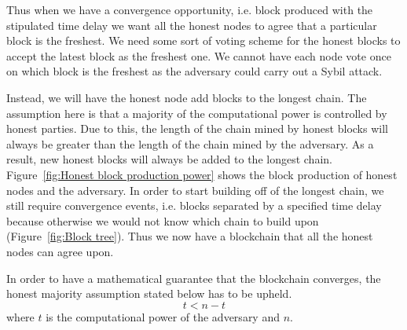Thus when we have a convergence opportunity, i.e. block produced with the stipulated time delay we want all the honest nodes to agree that a particular block is the freshest.
We need some sort of voting scheme for the honest blocks to accept the latest block as the freshest one. We cannot have each node vote once on which block is the freshest as the adversary could carry out a Sybil attack.

Instead, we will have the honest node add blocks to the longest chain. The assumption here is that a majority of the computational power is controlled by honest parties. Due to this, the length of the chain mined by honest blocks will always be greater than the length of the chain mined by the adversary. As a result, new honest blocks will always be added to the longest chain. Figure~\ref{fig:Honest block production power} shows the block production of honest nodes and the adversary.
In order to start building off of the longest chain, we still require convergence events, i.e. blocks separated by a specified time delay because otherwise we would not know which chain to build upon (Figure~\ref{fig:Block tree}). Thus we now have a blockchain that all the honest nodes can agree upon.

In order to have a mathematical guarantee that the blockchain converges, the honest majority assumption stated below has to be upheld.
\begin{equation}
    t < n-t
\end{equation}
where
$t$ is the computational power of the adversary and $n$.


